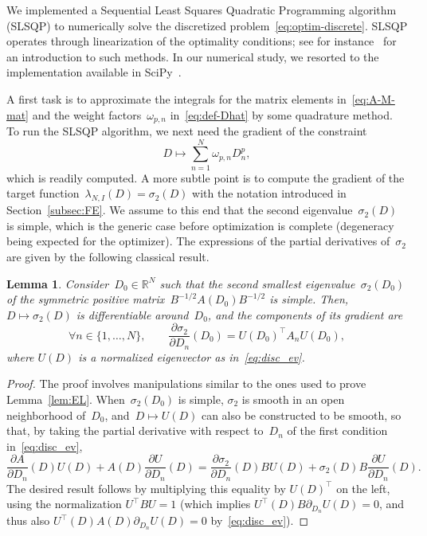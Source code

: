 \documentclass{article}
\newtheorem{lemma}{Lemma}
\newcommand{\R}{\mathbb{R}}
\def\R{\mathbb{R}}
\newcommand{\diff}{D}
\begin{document}
We implemented a Sequential Least Squares Quadratic Programming algorithm (SLSQP) to numerically solve the discretized problem~\eqref{eq:optim-discrete}. SLSQP operates through linearization of the optimality conditions; see for instance~\cite[Section 15.1]{Bonnans_optim} for an introduction to such methods. In our numerical study, we resorted to the implementation available in SciPy~\cite{2020SciPy-NMeth}. 

A first task is to approximate the integrals for the matrix elements in~\eqref{eq:A-M-mat} and the weight factors~$\omega_{p,n}$ in~\eqref{eq:def-Dhat} by some quadrature method. To run the SLSQP algorithm, we next need the gradient of the constraint
\[
\diff \mapsto \sum_{n=1}^N \omega_{p,n} \diff_n^p,
\]
which is readily computed. A more subtle point is to compute the gradient of the target function~$\lambda_{N,I}(\diff) = \sigma_2(\diff)$ with the notation introduced in Section~\ref{subsec:FE}. We assume to this end that the second eigenvalue~$\sigma_2(\diff)$ is simple, which is the generic case before optimization is complete (degeneracy being expected for the optimizer). The expressions of the partial derivatives of~$\sigma_2$ are given by the following classical result.

\begin{lemma}
  \label{lem:gradient}
  Consider~$\diff_0 \in \R^N$ such that the second smallest eigenvalue~$\sigma_2(\diff_0)$ of the symmetric positive matrix~$B^{-1/2}A(\diff_0) B^{-1/2}$ is simple. Then, $\diff \mapsto \sigma_2(\diff)$ is differentiable around~$\diff_0$, and the components of its gradient are
  \begin{equation}
    \label{eq:dlambda}
    \forall n \in \{1,\dots,N\}, \qquad \frac{\partial \sigma_2}{\partial \diff_n}(\diff_0) = U(\diff_0)^\top A_n U(\diff_0),
  \end{equation}
  where $U(\diff)$ is a normalized eigenvector as in~\eqref{eq:disc_ev}. 
\end{lemma}

\begin{proof}
  The proof involves manipulations similar to the ones used to prove Lemma~\ref{lem:EL}. When~$\sigma_2(\diff_0)$ is simple, $\sigma_2$ is smooth in an open neighborhood of~$\diff_0$, and~$D \mapsto U(D)$ can also be constructed to be smooth, so that, by taking the partial derivative with respect to~$\diff_n$ of the first condition in~\eqref{eq:disc_ev},
  \begin{equation}
    \label{eq:diff}
    \frac{\partial A}{\partial \diff_n}(\diff) U(\diff) + A(\diff) \frac{\partial U}{\partial \diff_n}(\diff) = \frac{\partial \sigma_2}{\partial \diff_n}(\diff) B U(\diff) + \sigma_2(\diff) B \frac{\partial U}{\partial \diff_n}(\diff).
\end{equation}
  The desired result follows by multiplying this equality by $U(\diff)^\top$ on the left, using the normalization $U^\top B U=1$ (which implies $U^\top (\diff) B \partial_{\diff_n} U(\diff)=0$, and thus also $U^\top (\diff) A(\diff) \partial_{\diff_n} U(\diff)=0$ by~\eqref{eq:disc_ev}).
\end{proof}
\end{document}
